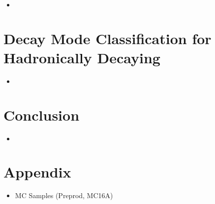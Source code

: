 \begin{itemize}
\item
\end{itemize}

\section{Decay Mode Classification for Hadronically Decaying}

\begin{itemize}
\item
\end{itemize}



\section{Conclusion}

\begin{itemize}
\item
\end{itemize}

\section{Appendix}

\begin{itemize}
\item MC Samples (Preprod, MC16A)
\end{itemize}

